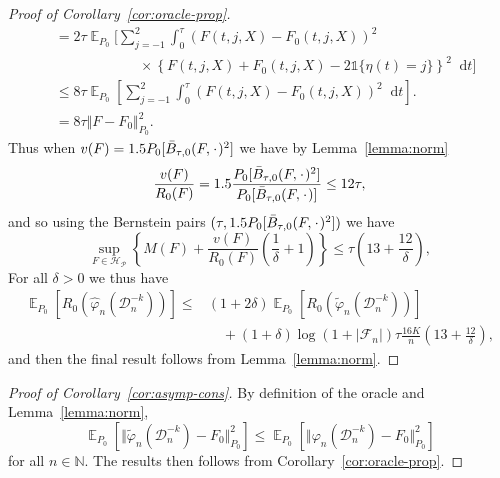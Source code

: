 \documentclass[11pt]{article}
\theoremstyle{thmstyleone}%
\theoremstyle{thmstyletwo}%
\theoremstyle{thmstylethree}%
\DeclareMathOperator{\E}{\mathbb{E}} %
\newcommand{\N}{\mathbb{N}}
\newcommand{\blank}{\makebox[1ex]{\textbf{$\cdot$}}}
\renewcommand{\phi}{\varphi}
\newcommand*\diff{\mathop{}\!\mathrm{d}}
\newcommand{\1}{\mathds{1}}
\newcommand{\data}{\ensuremath{\mathcal{D}}}
\begin{document}
\begin{proof}[Proof of Corollary~\ref{cor:oracle-prop}]
\begin{align*}
  & =2\tau
    \E_{P_0}\Bigg[
    \sum_{j=-1}^{2} \int_0^{\tau}
    \left(
    F(t, j, X) - F_0(t, j, X)
    \right)^2
  \\
  & \quad \quad \quad\quad \quad \quad \times
    \left\{
    F(t, j, X) +  F_0(t, j, X)-2 \1{\{\eta(t) = j\}}
    \right\}^2
    \diff t 
    \Bigg]
  \\
  & \leq
    8\tau \E_{P_0}{\left[
    \sum_{j=-1}^{2} \int_0^{\tau}
    \left(
    F(t, j, X) - F_0(t, j, X)
    \right)^2
    \diff t 
    \right]}.
  \\
  & =
    8\tau \Vert F - F_0 \Vert_{P_0}^2.
\end{align*}
Thus when \( v(F) = 1.5 P_0{[\bar{B}_{\tau,0}(F, \blank)^2]} \) we have by
Lemma~\ref{lemma:norm}
\begin{equation*}
  \frac{v(F)}{R_0(F)}
  = 1.5 \frac{P_0{[\bar{B}_{\tau,0}(F, \blank)^2]}}{P_0{[\bar{B}_{\tau,0}(F, \blank)]}}
  \leq 12 \tau,
\end{equation*}
and so using the Bernstein pairs \( (\tau, 1.5 P_0{[\bar{B}_{\tau,0}(F, \blank)^2]}) \) we have
\begin{equation*}
  \sup_{F \in \mathcal{H}_{\mathcal{P}}}
  \left\{
    M(F) + \frac{v(F)}{R_0(F)}
    \left(
      \frac{1}{\delta} + 1
    \right)
  \right\}
  \leq \tau
  \left(
    13 + \frac{12}{\delta}
  \right),
\end{equation*}
For all $\delta>0$ we thus have
\begin{align*}
  \E_{P_0}{\left[ R_0(\hat{\phi}_n(\data_n^{-k})) \right]}
  \leq
  &(1+2\delta)\E_{P_0}{\left[ R_0(\tilde{\phi}_n(\data_n^{-k})) \right]}
  \\
  & \quad
    + (1+\delta)\log(1 + |\mathcal{F}_n|) \tau \frac{16 K}{n}
    \left(
    13 + \frac{12}{\delta}
    \right),
\end{align*}
and then the final result follows from Lemma~\ref{lemma:norm}.
\end{proof}

\begin{proof}[Proof of Corollary~\ref{cor:asymp-cons}]
  By definition of the oracle and Lemma~\ref{lemma:norm},
  \begin{equation*}
    \E_{P_0}{\left[ \Vert \tilde{\phi}_n(\data_n^{-k}) - F_0 \Vert_{P_0}^2
      \right]} \leq \E_{P_0}{\left[ \Vert \phi_n(\data_n^{-k}) - F_0 \Vert_{P_0}^2
      \right]}  
  \end{equation*}
  for all \( n \in \N \). The results then follows from
  Corollary~\ref{cor:oracle-prop}.
\end{proof}
\end{document}
